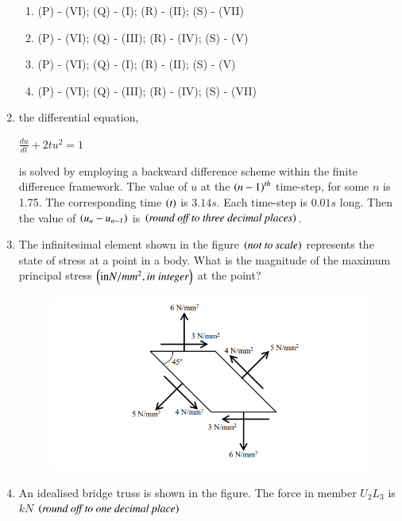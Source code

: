 \documentclass[journal,12pt,onecolumn]{IEEEtran}
\theoremstyle{remark}
\begin{document}
\begin{enumerate}
\begin{enumerate}
\item (P) - (VI); (Q) - (I); (R) - (II); (S) - (VII)
\item (P) - (VI); (Q) - (III); (R) - (IV); (S) - (V)
\item (P) - (VI); (Q) - (I); (R) - (II); (S) - (V)
\item (P) - (VI); (Q) - (III); (R) - (IV); (S) - (VII)
\end{enumerate}

\item the differential equation,

\begin{center}
$\frac{du}{dt}+2tu^2=1$
\end{center}

is solved by employing a backward difference scheme within the finite difference framework. The value of $u$ at the $\left(n-1\right)^{th}$ time-step, for some $n$ is 1.75. The corresponding time $\left(\textit{t}\right)$ is $3.14s$. Each time-step is $0.01s$ long. Then the value of $\left(u_n-u_{n-1}\right)$ is \underline{\hspace{3cm}} $\left(\textit{round off to three decimal places}\right)$.

\hfill{}

\item The infinitesimal element shown in the figure $\left(\textit{not to scale}\right)$ represents the state of stress at a point in a body. What is the magnitude of the maximum principal stress $\left(\text{in} N/mm^2, \textit{in integer}\right)$ at the point? \underline{\hspace{3cm}}

\hfill{}
\begin{figure}[H]
\centering
\includegraphics[width=0.5\linewidth]{figs/q53.png}
\caption*{}
\label{fig:Q.53}
\end{figure}

\item An idealised bridge truss is shown in the figure. The force in member $U_2L_3$ is \underline{\hspace{3cm}}$kN$ $\left(\textit{round off to one decimal place}\right)$


\end{enumerate}
\end{document}
